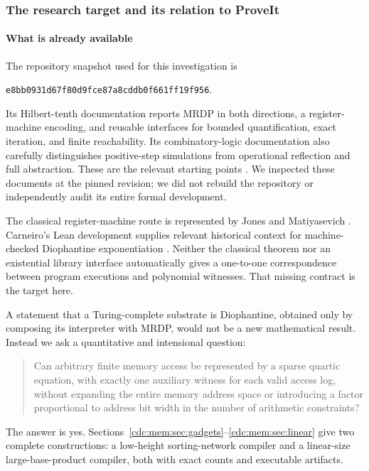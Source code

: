 \documentclass[11pt,a4paper]{article}
\theoremstyle{definition}
\theoremstyle{remark}
\begin{document}
\subsubsection{The research target and its relation to ProveIt}
\paragraph{What is already available}
The repository snapshot used for this investigation is
\begin{center}
\texttt{e8bb0931d67f80d9fce87a8cddb0f661ff19f956}.
\end{center}
Its Hilbert-tenth documentation reports MRDP in both directions, a
register-machine encoding, and reusable interfaces for bounded quantification,
exact iteration, and finite reachability. Its combinatory-logic documentation
also carefully distinguishes positive-step simulations from operational
reflection and full abstraction. These are the relevant starting points
\cite{repo-h10,repo-status,repo-cl}. We inspected these documents at the pinned
revision; we did not rebuild the repository or independently audit its entire
formal development.

The classical register-machine route is represented by Jones and Matiyasevich
\cite{jm1984}. Carneiro's Lean development supplies relevant historical context
for machine-checked Diophantine exponentiation \cite{carneiro}. Neither the
classical theorem nor an existential library interface automatically gives a
one-to-one correspondence between program executions and polynomial witnesses.
That missing contract is the target here.

A statement that a Turing-complete substrate is Diophantine, obtained only by
composing its interpreter with MRDP, would not be a new mathematical result.
Instead we ask a quantitative and intensional question:
\begin{quote}
Can arbitrary finite memory access be represented by a sparse quartic equation,
with exactly one auxiliary witness for each valid access log, without expanding
the entire memory address space or introducing a factor proportional to address
bit width in the number of arithmetic constraints?
\end{quote}
The answer is yes. Sections~\ref{cdc:mem:sec:gadgets}--\ref{cdc:mem:sec:linear} give two complete
constructions: a low-height sorting-network compiler and a linear-size
large-base-product compiler, both with exact counts and executable artifacts.
\end{document}
